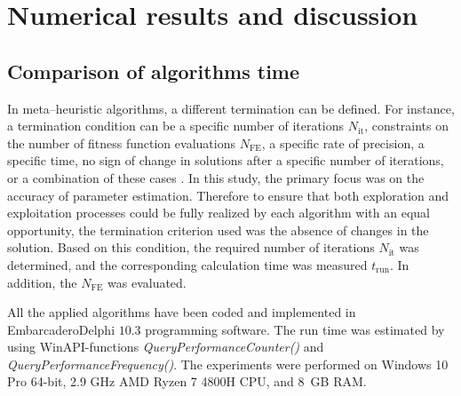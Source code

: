 \documentclass[a4paper,fleqn]{cas-sc}
\begin{document}
\section{Numerical results and discussion}\label{Result}

\subsection{Comparison of algorithms time}
In meta--heuristic algorithms, a different termination can be defined.
For instance, a termination condition can be a specific number of iterations $N_\mathrm{it}$,
constraints on the number of fitness function evaluations $N_\mathrm{FE}$,
a specific rate of precision,
a specific time,
no sign of change in solutions after a specific number of iterations,
or a combination of these cases \cite{IntelligentChaoticClonal}.
In this study, the primary focus was on the accuracy of parameter estimation.
Therefore to ensure that both exploration and exploitation processes could be fully realized
by each algorithm with an equal opportunity, the termination criterion used was the absence of changes in the solution.
Based on this condition, the required number of iterations $N_\mathrm{it}$ was determined,
and the corresponding calculation time was measured $t_\mathrm{run}$.
In addition, the $N_\mathrm{FE}$ was evaluated.

All the applied algorithms have been coded and implemented in Embarcadero\textregistered Delphi $10.3$ programming software.
The run time was estimated by using WinAPI-functions \emph{QueryPerformanceCounter()} and \emph{QueryPerformanceFrequency()}.
The experiments were performed on Windows 10 Pro 64-bit,
2.9 GHz AMD Ryzen 7 4800H CPU, and 8~GB RAM.

\end{document}

